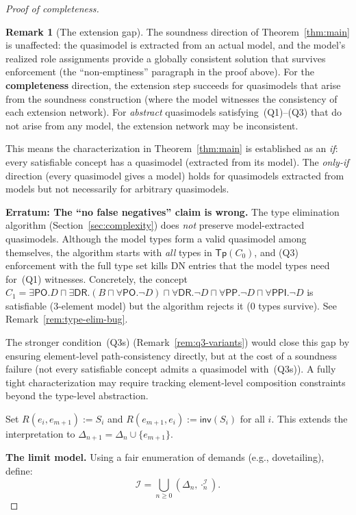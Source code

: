\documentclass[a4paper,11pt]{article}
\theoremstyle{definition}
\newtheorem{remark}[theorem]{Remark}
\newcommand{\interp}{\ensuremath{\mathcal{I}}}
\newcommand{\DR}{\ensuremath{\mathsf{DR}}}
\newcommand{\PO}{\ensuremath{\mathsf{PO}}}
\newcommand{\PP}{\ensuremath{\mathsf{PP}}}
\newcommand{\PPI}{\ensuremath{\mathsf{PPI}}}
\newcommand{\inv}{\ensuremath{\mathsf{inv}}}
\newcommand{\Tp}{\ensuremath{\mathsf{Tp}}}
\begin{document}
\begin{proof}[Proof of completeness]
\begin{remark}[The extension gap]
The soundness direction of Theorem~\ref{thm:main} is unaffected:
the quasimodel is extracted from an actual model, and the model's
realized role assignments provide a globally consistent solution that
survives enforcement (the ``non-emptiness'' paragraph in the proof
above).  For the \textbf{completeness} direction, the extension step
succeeds for quasimodels that arise from the soundness construction
(where the model witnesses the consistency of each extension network).
For \emph{abstract} quasimodels satisfying~(Q1)--(Q3) that do not
arise from any model, the extension network may be inconsistent.

This means the characterization in Theorem~\ref{thm:main} is
established as an \emph{if}: every satisfiable concept has a
quasimodel (extracted from its model).  The \emph{only-if} direction
(every quasimodel gives a model) holds for quasimodels extracted from
models but not necessarily for arbitrary quasimodels.

\medskip
\noindent\textbf{Erratum: The ``no false negatives'' claim is
wrong.}\; The type elimination algorithm
(Section~\ref{sec:complexity}) does \emph{not} preserve model-extracted
quasimodels.  Although the model types form a valid quasimodel among
themselves, the algorithm starts with \emph{all} types in $\Tp(C_0)$,
and (Q3) enforcement with the full type set kills DN entries that the
model types need for~(Q1) witnesses.  Concretely, the concept
$C_1 = \exists \PO.D \sqcap \exists \DR.(B \sqcap \forall \PO.\neg D)
\sqcap \forall \DR.\neg D \sqcap \forall \PP.\neg D \sqcap \forall
\PPI.\neg D$ is satisfiable (3-element model) but the algorithm rejects
it (0 types survive).  See Remark~\ref{rem:type-elim-bug}.

The stronger condition~(Q3s) (Remark~\ref{rem:q3-variants}) would
close this gap by ensuring element-level path-consistency directly,
but at the cost of a soundness failure (not every satisfiable concept
admits a quasimodel with~(Q3s)).  A fully tight characterization may
require tracking element-level composition constraints beyond the
type-level abstraction.
\end{remark}

Set $R(e_i, e_{m+1}) := S_i$ and $R(e_{m+1}, e_i) := \inv(S_i)$
for all $i$.  This extends the interpretation to $\Delta_{n+1} =
\Delta_n \cup \{e_{m+1}\}$.

\medskip\noindent\textbf{The limit model.}\;
Using a fair enumeration of demands (e.g., dovetailing), define:
\[
  \interp = \bigcup_{n \geq 0} (\Delta_n, \cdot^{\interp}_n).
\]


\end{proof}
\end{document}
